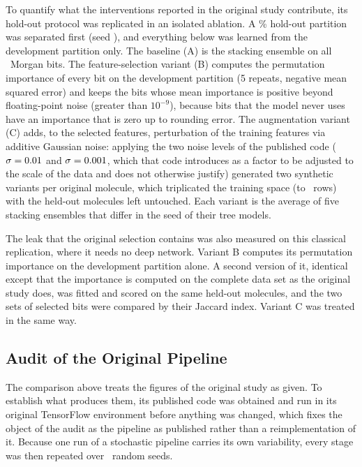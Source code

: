 To quantify what the interventions reported in the original study contribute, its hold-out protocol was replicated in
an isolated ablation. A \HoldoutPct\% hold-out partition was separated first (seed \RandomSeed), and everything below was learned from the development partition only. The baseline (A) is the stacking ensemble on all \MorganNFeaturesTotal\ Morgan bits. The feature-selection variant (B) computes the permutation importance of every bit on the development partition (5 repeats, negative mean squared error) and keeps the bits whose mean importance is positive beyond floating-point noise (greater than $10^{-9}$), because bits that the model never uses have an importance that is zero up to rounding error. The augmentation variant (C) adds, to the selected features, perturbation of the training features via additive Gaussian noise: applying the two noise levels of the published code ($\sigma = 0.01$ and $\sigma = 0.001$, which that code introduces as a factor to be adjusted to the scale of the data and does not otherwise justify) generated two synthetic variants per original molecule, which triplicated the training space (to \ExpCAugSizeTrain\ rows) with the held-out molecules left untouched. Each variant is the average of five stacking ensembles that differ in the seed of their tree models.

The leak that the original selection contains was also measured on this classical replication, where it needs no deep
network. Variant B computes its permutation importance on the development partition alone. A second version of it,
identical except that the importance is computed on the complete data set as the original study does, was fitted and
scored on the same held-out molecules, and the two sets of selected bits were compared by their Jaccard index. Variant
C was treated in the same way.


\subsection{Audit of the Original Pipeline}
\label{sec:materials_audit}

The comparison above treats the figures of the original study as given. To establish what produces them, its published
code was obtained and run in its original TensorFlow environment before anything was changed, which fixes the object of
the audit as the pipeline as published rather than a reimplementation of it. Because one run of a stochastic pipeline
carries its own variability, every stage was then repeated over \KarReproNSeeds\ random seeds.

